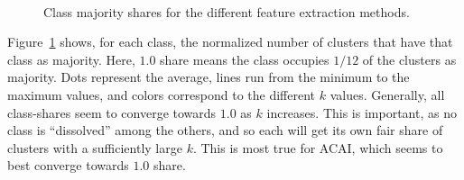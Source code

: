 			\begin{figure}
				\centering
				 \\
				\caption[Class majority shares in the renewed EMA evaluation]{Class majority shares for the different feature extraction methods.}
				\label{fig:shares}
			\end{figure}
			
			Figure~\ref{fig:shares} shows, for each class, the normalized number of clusters that have that class as majority.
			Here, $1.0$ share means the class occupies $1/12$ of the clusters as majority.
			Dots represent the average, lines run from the minimum to the maximum values, and colors correspond to the different $k$ values.
			Generally, all class-shares seem to converge towards $1.0$ as $k$ increases.
			This is important, as no class is ``dissolved'' among the others, and so each will get its own fair share of clusters with a sufficiently large $k$.
			This is most true for \ac{ACAI}, which seems to best converge towards $1.0$ share.
			
